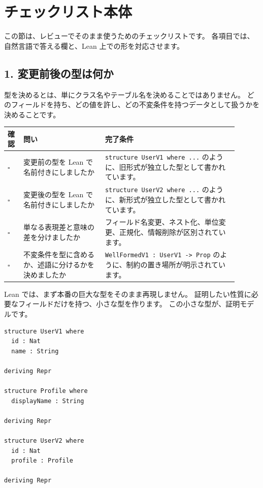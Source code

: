 \section{チェックリスト本体}

この節は、レビューでそのまま使うためのチェックリストです。
各項目では、自然言語で答える欄と、Lean 上での形を対応させます。

\subsection{1. 変更前後の型は何か}

型を決めるとは、単にクラス名やテーブル名を決めることではありません。
どのフィールドを持ち、どの値を許し、どの不変条件を持つデータとして扱うかを決めることです。

\begin{longtable}{@{}p{0.06\linewidth}p{0.32\linewidth}p{0.52\linewidth}@{}}
\toprule
確認 & 問い & 完了条件 \\
\midrule
\endhead
\(\square\) & 変更前の型を Lean で名前付きにしましたか & \texttt{structure UserV1 where ...} のように、旧形式が独立した型として書かれています。 \\
\(\square\) & 変更後の型を Lean で名前付きにしましたか & \texttt{structure UserV2 where ...} のように、新形式が独立した型として書かれています。 \\
\(\square\) & 単なる表現差と意味の差を分けましたか & フィールド名変更、ネスト化、単位変更、正規化、情報削除が区別されています。 \\
\(\square\) & 不変条件を型に含めるか、述語に分けるかを決めましたか & \texttt{WellFormedV1 : UserV1 -> Prop} のように、制約の置き場所が明示されています。 \\
\bottomrule
\end{longtable}

Lean では、まず本番の巨大な型をそのまま再現しません。
証明したい性質に必要なフィールドだけを持つ、小さな型を作ります。
この小さな型が、証明モデルです。

\begin{listing}[htbp]
\begin{verbatim}
structure UserV1 where
  id : Nat
  name : String

deriving Repr

structure Profile where
  displayName : String

deriving Repr

structure UserV2 where
  id : Nat
  profile : Profile

deriving Repr
\end{verbatim}
\caption{\texttt{UserV1}・\texttt{Profile}・\texttt{UserV2}}
\label{lst:appD_old_new_types}
\end{listing}

